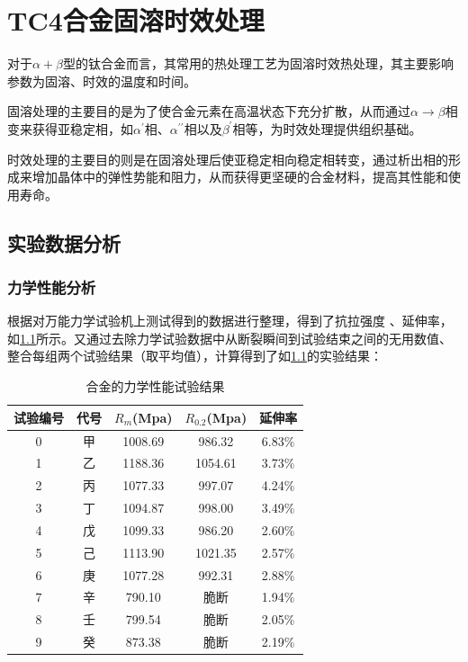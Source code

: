 \chapter{TC4合金固溶时效处理}

对于$\alpha+\beta$型的\ti 钛合金而言，其常用的热处理工艺为固溶时效热处理，其主要影响参数为固溶、时效的温度和时间\cite{mirror1,ranxingGurongwenduduiTi6Al4VELItaihejinxianweizuzhijixingnengdeyingxiang2021}。

固溶处理的主要目的是为了使合金元素在高温状态下充分扩散，从而通过$\alpha \to \beta$相变来获得亚稳定相，如$\alpha^{\prime}$相、$\alpha^{\prime\prime}$相以及$\beta^{\prime}$相等，为时效处理提供组织基础。

时效处理的主要目的则是在固溶处理后使亚稳定相向稳定相转变，通过析出相的形成来增加晶体中的弹性势能和阻力，从而获得更坚硬的合金材料，提高其性能和使用寿命。

\section{实验数据分析}
\subsection{力学性能分析}
根据对万能力学试验机上测试得到的数据进行整理，得到了抗拉强度%
、延伸率，如\ref{sec:mystrength}所示。又通过去除力学试验数据中从断裂瞬间到试验结束之间的无用数值、整合每组两个试验结果（取平均值），计算得到了如\ref{sec:mystrength}的实验结果：
\begin{table}[htbp]
	\centering
	\caption{\ti 合金的力学性能试验结果}
	\label{sec:mystrength}
	\begin{tabular}{ccccc}
		\toprule
		试验编号& 代号&$ R_m $(Mpa)&$ R_0.2 $(Mpa)&延伸率 \\
		\midrule
		0 & 甲 & 1008.69 &986.32& 6.83$\%$ \\
		1 & 乙 & 1188.36 &1054.61 &3.73$\%$ \\
		2 & 丙 & 1077.33 & 997.07&4.24$\%$ \\
		3 & 丁 & 1094.87 & 998.00&3.49$\%$ \\
		4 & 戊 & 1099.33 &986.20 &2.60$\%$ \\
		5 & 己 & 1113.90 & 1021.35&2.57$\%$ \\
		6 & 庚 & 1077.28 &992.31& 2.88$\%$ \\
		7 & 辛 & 790.10 & 脆断&1.94$\%$ \\
		8 & 壬 & 799.54 &脆断& 2.05$\%$ \\
		9 & 癸 & 873.38 & 脆断&2.19$\%$ \\
		\bottomrule
	\end{tabular}
\end{table}

